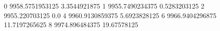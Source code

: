 0 9958.5751953125 3.3544921875
1 9955.7490234375 0.5283203125
2 9955.220703125 0.0
4 9960.9130859375 5.6923828125
6 9966.9404296875 11.7197265625
8 9974.896484375 19.67578125
